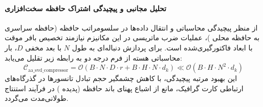 \paragraph{تحلیل مجانبی و پیچیدگی اشتراک حافظه سخت‌افزاری}
از منظر پیچیدگی محاسباتی و انتقال داده‌ها در سلسومراتب حافظه (حافظه سراسری  به حافظه محلی )، عملیات ضرب ماتریسی در این مکانیزم نیازمند تخصیص بافر موقت با ابعاد فاکتورگیری‌شده است. برای پردازش دنباله‌ای به طول $N$ با بعد مخفی $D$، بار محاسباتی هسته از فرم درجه دو به رابطه زیر تقلیل می‌یابد:
\begin{equation}
\label{eq:complexity_aa_svd_compressor}
\mathcal{C}_{\text{aa\_svd\_compressor}} = \mathcal{O}\left( B \cdot N \cdot D \cdot r + B \cdot H \cdot N \cdot d_k \right) \ll \mathcal{O}\left( B \cdot H \cdot N^2 \cdot d_k \right)
\end{equation}
این بهبود مرتبه پیچیدگی، با کاهش چشمگیر حجم تبادل تانسورها در گذرگاه‌های ارتباطی کارت گرافیک، مانع از اشباع پهنای باند حافظه (پدیده ) در فرآیند استنتاج طولانی‌مدت می‌گردد.
